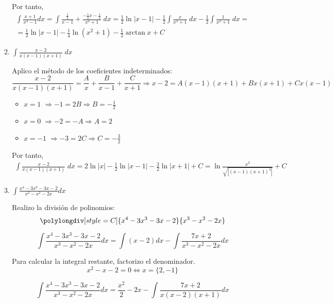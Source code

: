 \begin{ejercicio}
\begin{enumerate}
    Por tanto,
    \begin{multline*}
        \int \frac{x+1}{x^4 -1} dx = \int \frac{\frac{1}{2}}{x-1}+\frac{-\frac{1}{2}x-\frac{1}{2}}{x^2+1}\;dx
        = \frac{1}{2}\ln|x-1| -\frac{1}{2}\int\frac{x}{x^2+1}\;dx -\frac{1}{2}\int \frac{1}{x^2+1}\;dx
        =\\=
        \frac{1}{2}\ln|x-1| -\frac{1}{4}\ln{(x^2+1)} -\frac{1}{2} \arctan x +C
    \end{multline*}

    \item $\displaystyle \int\frac{x-2}{x(x-1)(x+1)}\;dx$

    Aplico el método de los coeficientes indeterminados:
    \begin{equation*}
        \frac{x-2}{x(x-1)(x+1)} = \frac{A}{x}+\frac{B}{x-1} + \frac{C}{x+1} \Longrightarrow x-2=A(x-1)(x+1)+Bx(x+1)+Cx(x-1)
    \end{equation*}
    \begin{itemize}
        \item \underline{$x=1$} $\Longrightarrow -1=2B \Longrightarrow B=-\frac{1}{2}$
        \item \underline{$x=0$} $\Longrightarrow -2=-A \Longrightarrow A=2$
        \item \underline{$x=-1$} $\Longrightarrow -3=2C \Longrightarrow C=-\frac{3}{2}$
    \end{itemize}

    Por tanto,
    \begin{multline*}
        \int\frac{x-2}{x(x-1)(x+1)}\;dx
        = 2\ln |x|-\frac{1}{2}\ln |x-1|-\frac{3}{2}\ln|x+1|+C
        = \ln \frac{x^2}{\sqrt{|(x-1)(x+1)^3|}}+C
    \end{multline*}

    \item $\displaystyle \int \frac{x^4-3x^3-3x-2}{x^3-x^2-2x}dx$

    Realizo la división de polinomios:
    $$\polylongdiv[style=C]{x^4-3x^3-3x-2}{x^3-x^2-2x}$$

    \begin{equation*}
        \int \frac{x^4-3x^3-3x-2}{x^3-x^2-2x}dx = \int (x-2)dx -\int \frac{7x+2}{x^3-x^2-2x}dx 
    \end{equation*}

    Para calcular la integral restante, factorizo el denominador.
    $$x^2-x-2=0 \Longleftrightarrow x=\{2, -1\}$$

    \begin{equation*}
        \int \frac{x^4-3x^3-3x-2}{x^3-x^2-2x}dx = \frac{x^2}{2}-2x -\int \frac{7x+2}{x(x-2)(x+1)}dx 
    \end{equation*}


\end{enumerate}
\end{ejercicio}
